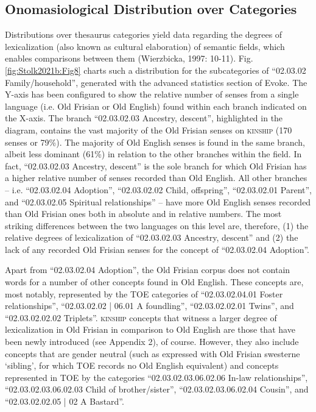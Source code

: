 \subsection{Onomasiological Distribution over Categories}
\label{sect:Stolk2021b:OnomasiologicalDistrubtionOverCategories}
Distributions over thesaurus categories yield data regarding the degrees of lexicalization (also known as cultural elaboration) of semantic fields, which enables comparisons between them (Wierzbicka, 1997: 10-11). Fig. \ref{fig:Stolk2021b:Fig8} charts such a distribution for the subcategories of “02.03.02 Family/household”, generated with the advanced statistics section of Evoke.  The Y-axis has been configured to show the relative number of senses from a single language (i.e. Old Frisian or Old English) found within each branch indicated on the X-axis. The branch “02.03.02.03 Ancestry, descent”, highlighted in the diagram, contains the vast majority of the Old Frisian senses on \textsc{kinship} (170 senses or 79\%). The majority of Old English senses is found in the same branch, albeit less dominant (61\%) in relation to the other branches within the field. In fact, “02.03.02.03 Ancestry, descent” is the sole branch for which Old Frisian has a higher relative number of senses recorded than Old English. All other branches – i.e. “02.03.02.04 Adoption”, “02.03.02.02 Child, offspring”, “02.03.02.01 Parent”, and “02.03.02.05 Spiritual relationships” – have more Old English senses recorded than Old Frisian ones both in absolute and in relative numbers. The most striking differences between the two languages on this level are, therefore, (1) the relative degrees of lexicalization of “02.03.02.03 Ancestry, descent” and (2) the lack of any recorded Old Frisian senses for the concept of “02.03.02.04 Adoption”. 

Apart from “02.03.02.04 Adoption”, the Old Frisian corpus does not contain words for a number of other concepts found in Old English. These concepts are, most notably, represented by the TOE categories of “02.03.02.04.01 Foster relationships”, “02.03.02.02 | 06.01 A foundling”, “02.03.02.02.01 Twins”, and “02.03.02.02.02 Triplets”.  \textsc{kinship} concepts that witness a larger degree of lexicalization in Old Frisian in comparison to Old English are those that have been newly introduced (see Appendix 2), of course. However, they also include concepts that are gender neutral (such as expressed with Old Frisian swesterne ‘sibling’, for which TOE records no Old English equivalent) and concepts represented in TOE by the categories “02.03.02.03.06.02.06 In-law relationships”, “02.03.02.03.06.02.03 Child of brother/sister”, “02.03.02.03.06.02.04 Cousin”, and “02.03.02.02.05 | 02 A Bastard”. 

